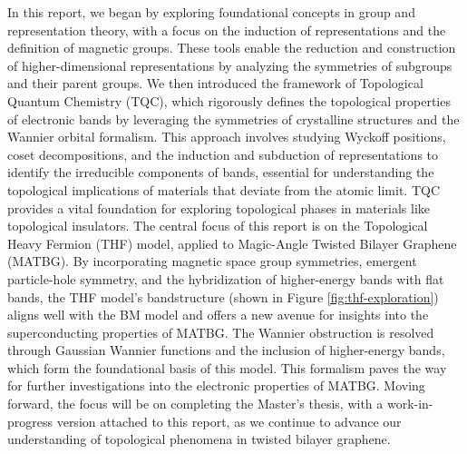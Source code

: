 \documentclass[12pt]{report}
\begin{document}
In this report, we began by exploring foundational concepts in group and representation theory, with a focus on the induction of representations and the definition of magnetic groups. These tools enable the reduction and construction of higher-dimensional representations by analyzing the symmetries of subgroups and their parent groups. We then introduced the framework of Topological Quantum Chemistry (TQC), which rigorously defines the topological properties of electronic bands by leveraging the symmetries of crystalline structures and the Wannier orbital formalism. This approach involves studying Wyckoff positions, coset decompositions, and the induction and subduction of representations to identify the irreducible components of bands, essential for understanding the topological implications of materials that deviate from the atomic limit. TQC provides a vital foundation for exploring topological phases in materials like topological insulators. The central focus of this report is on the Topological Heavy Fermion (THF) model, applied to Magic-Angle Twisted Bilayer Graphene (MATBG). By incorporating magnetic space group symmetries, emergent particle-hole symmetry, and the hybridization of higher-energy bands with flat bands, the THF model’s bandstructure (shown in Figure \ref{fig:thf-exploration}) aligns well with the BM model \cite{macdonald2011, topoheavyfermion2022} and offers a new avenue for insights into the superconducting properties of MATBG. The Wannier obstruction is resolved through Gaussian Wannier functions and the inclusion of higher-energy bands, which form the foundational basis of this model. This formalism paves the way for further investigations into the electronic properties of MATBG. Moving forward, the focus will be on completing the Master's thesis, with a work-in-progress version attached to this report, as we continue to advance our understanding of topological phenomena in twisted bilayer graphene.
\end{document}
